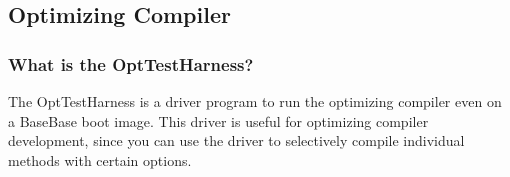 \subsection{Optimizing Compiler}

\subsubsection{What is the OptTestHarness?}

The OptTestHarness is a driver program to run the optimizing compiler even
on a BaseBase boot image.  This driver is useful for optimizing compiler
development, since you can use the driver to selectively compile
individual methods with certain options.
